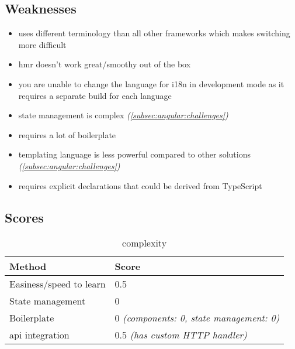 \subsection{Weaknesses}
\label{subsec:angular:weaknesses}
\begin{itemize}
    \item uses different terminology than all other frameworks which makes switching more difficult
    \item \acrshort{hmr} doesn't work great/smoothy out of the box
    \item you are unable to change the language for \acrshort{i18n} in development mode as it requires a separate build for each language
    \item state management is complex \textit{(\autoref{subsec:angular:challenges})}
    \item requires a lot of boilerplate
    \item templating language is less powerful compared to other solutions \textit{(\autoref{subsec:angular:challenges})}
    \item requires explicit declarations that could be derived from TypeScript
\end{itemize}


\subsection{Scores}
\label{subsec:angular:scores}

\begin{table}[H]
    \centering
    \begin{tabular}{|l|l|}
        \hline
        \textbf{Method}            & \textbf{Score}                                  \\
        \hline
        Easiness/speed to learn    & 0.5                                             \\ \hline
        State management           & 0                                               \\ \hline
        Boilerplate                & 0 \textit{(components: 0, state management: 0)} \\ \hline
        \acrshort{api} integration & 0.5 \textit{(has custom HTTP handler)}          \\ \hline
    \end{tabular}
    \caption{complexity}
    \label{tab:angular:complexity}
\end{table}

